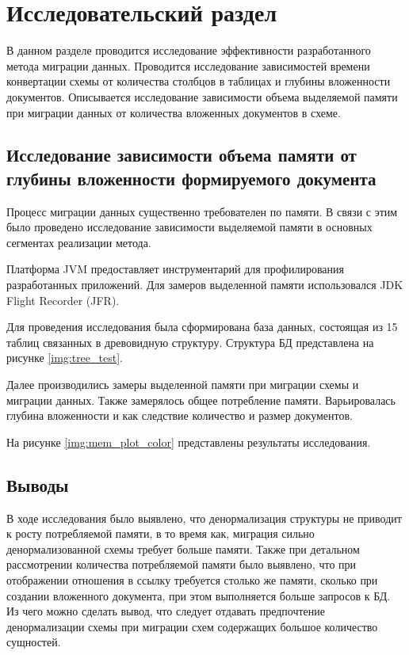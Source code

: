 \chapter{Исследовательский раздел}
В данном разделе проводится исследование эффективности разработанного метода миграции данных.
Проводится исследование зависимостей времени конвертации схемы от количества столбцов в таблицах 
и глубины вложенности документов. 
Описывается исследование зависимости объема выделяемой памяти при миграции данных 
от количества вложенных документов в схеме.

\section{Исследование зависимости объема памяти от глубины вложенности формируемого документа}
Процесс миграции данных существенно требователен по памяти.
В связи с этим было проведено исследование зависимости выделяемой памяти в основных сегментах реализации метода.

Платформа JVM предоставляет инструментарий для профилирования разработанных приложений.
Для замеров выделенной памяти использовался JDK Flight Recorder (JFR).

Для проведения исследования была сформирована база данных, 
состоящая из 15 таблиц связанных в древовидную структуру.
Структура БД представлена на рисунке \ref{img:tree_test}.

\clearpage

Далее производились замеры выделенной памяти при миграции схемы и миграции данных. 
Также замерялось общее потребление памяти. 
Варьировалась глубина вложенности и как следствие количество и размер документов.

На рисунке \ref{img:mem_plot_color} представлены результаты исследования.

\section*{Выводы}
В ходе исследования было выявлено, 
что денормализация структуры не приводит
к росту потребляемой памяти, в то время как, 
миграция сильно денормализованной схемы требует больше памяти.
Также при детальном рассмотрении количества потребляемой памяти
было выявлено, что при отображении отношения в ссылку требуется столько же памяти,
сколько при создании вложенного документа, при этом выполняется больше запросов к БД.
Из чего можно сделать вывод, что следует отдавать предпочтение денормализации схемы 
при миграции схем содержащих большое количество сущностей.


